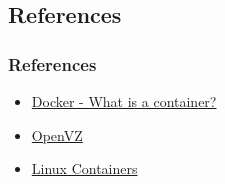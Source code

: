 \subsection{References}
\begin{frame}
	\frametitle{References}
	\begin{itemize}
		\item \href{https://www.docker.com/resources/what-container}{Docker - What is a container?}
		\item \href{https://openvz.org/}{OpenVZ}
		\item \href{https://linuxcontainers.org/}{Linux Containers}
	\end{itemize}
\end{frame}
